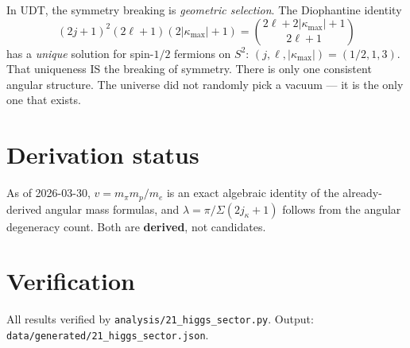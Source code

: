 \documentclass[11pt,letterpaper]{article}
\numberwithin{equation}{section}
\begin{document}
In UDT, the symmetry breaking is \emph{geometric selection}.  The
Diophantine identity
\begin{equation}
  (2j+1)^2(2\ell+1)(2|\kappa_\mathrm{max}|+1)
  = \binom{2\ell + 2|\kappa_\mathrm{max}| + 1}{2\ell + 1}
\end{equation}
has a \emph{unique} solution for spin-$1/2$ fermions on $S^2$:
$(j, \ell, |\kappa_\mathrm{max}|) = (1/2, 1, 3)$.  That uniqueness
IS the breaking of symmetry.  There is only one consistent angular
structure.  The universe did not randomly pick a vacuum --- it is the
only one that exists.

\section{Derivation status}

As of 2026-03-30, $v = m_\pi m_p / m_e$ is an exact algebraic
identity of the already-derived angular mass formulas, and
$\lambda = \pi/\Sigma(2j_\kappa+1)$ follows from the angular
degeneracy count.  Both are \textbf{derived}, not candidates.

\section{Verification}

All results verified by \texttt{analysis/21\_higgs\_sector.py}.
Output: \texttt{data/generated/21\_higgs\_sector.json}.
\end{document}
